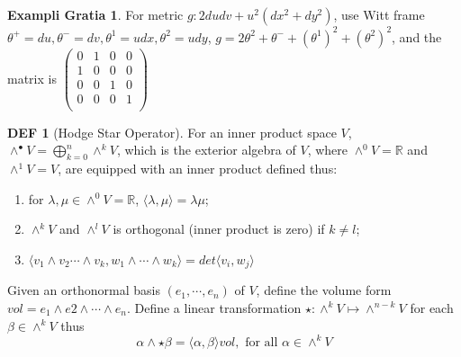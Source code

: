 \documentclass[twocolumn]{article}
\newcommand{\R}{\mathbb{R}}
\theoremstyle{definition}
\newtheorem{example}[thm]{Exampli Gratia}
\newtheorem{defi}[thm]{DEF}
\begin{document}
\begin{example}
	For metric $g: 2dudv + u^2(dx^2 + dy^2)$, use Witt frame $\theta^+ = du, \theta^- = dv, \theta^1 = udx, \theta^2 = udy$, $g = 2 \theta^2+\theta^{-} + (\theta^1)^2 + (\theta^2)^2$, and the matrix is 
	$ 
	\begin{pmatrix}
		0 & 1 & 0 & 0 \\
		1 & 0 & 0 & 0 \\
		0 & 0 & 1 & 0 \\
		0 & 0 & 0 & 1 \\
	\end{pmatrix}
	$
\end{example}

\begin{defi}[Hodge Star Operator]
	For an inner product space $V$, $\wedge^{\bullet}V = \bigoplus^n_{k=0} \wedge^k V$, which is the exterior algebra of $V$, where $\wedge^0 V = \R$ and $\wedge^1 V = V$, are equipped with an inner product defined thus:
	\begin{enumerate}
		\item for $\lambda, \mu \in \wedge^0 V = \R$, $\langle \lambda, \mu \rangle = \lambda \mu$;
		\item $\wedge^k V$ and $\wedge^l V$ is orthogonal (inner product is zero) if $k \neq l$;
		\item $\langle v_1 \wedge v_2 \cdots \wedge v_k, w_1 \wedge \cdots \wedge w_k \rangle = det\langle v_i, w_j \rangle$
	\end{enumerate}
	Given an orthonormal basis $(e_1, \cdots, e_n)$ of $V$, define the volume form $vol = e_1\wedge e2 \wedge \cdots \wedge e_n$. 
	Define a linear transformation $\star: \wedge^k V \mapsto \wedge^{n-k}V$ for each $\beta \in \wedge^{k} V$ thus
	$$
	\alpha \wedge \star \beta = \langle \alpha, \beta \rangle vol, \text{ for all } \alpha \in \wedge^{k} V
	$$
\end{defi}
\end{document}
